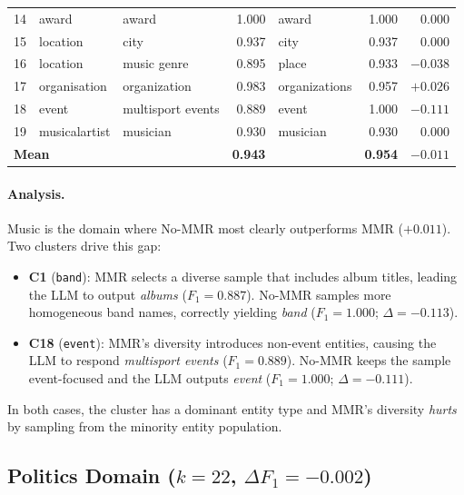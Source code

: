 \documentclass[11pt,a4paper]{article}
\begin{document}
\begin{table}[h]
\begin{tabular}{r l l r l r r}
14 & award         & award           & \cellcolor{green!15}1.000 & award        & \cellcolor{green!15}1.000 & $0.000$ \\
15 & location      & city            & \cellcolor{yellow!25}0.937 & city         & \cellcolor{yellow!25}0.937 & $0.000$ \\
16 & location      & music genre     & \cellcolor{red!15}0.895  & place        & \cellcolor{yellow!25}0.933 & $-0.038$ \\
17 & organisation  & organization    & \cellcolor{yellow!25}0.983 & organizations & \cellcolor{yellow!25}0.957 & $+0.026$ \\
18 & event         & multisport events & \cellcolor{red!15}0.889 & event       & \cellcolor{green!15}1.000 & $-0.111$ \\
19 & musicalartist & musician        & \cellcolor{yellow!25}0.930 & musician     & \cellcolor{yellow!25}0.930 & $0.000$ \\
\midrule
\multicolumn{2}{l}{\textbf{Mean}} &
  & \textbf{0.943} & & \textbf{0.954} & $-0.011$ \\
\bottomrule
\end{tabular}
\end{table}

\paragraph{Analysis.}
Music is the domain where No-MMR most clearly outperforms MMR ($+0.011$).
Two clusters drive this gap:
\begin{itemize}[leftmargin=1.5em]
  \item \textbf{C1} (\texttt{band}): MMR selects a diverse sample that includes album titles, leading the LLM to output \textit{albums} ($F_1 = 0.887$).  No-MMR samples more homogeneous band names, correctly yielding \textit{band} ($F_1 = 1.000$; $\Delta = -0.113$).
  \item \textbf{C18} (\texttt{event}): MMR's diversity introduces non-event entities, causing the LLM to respond \textit{multisport events} ($F_1 = 0.889$).  No-MMR keeps the sample event-focused and the LLM outputs \textit{event} ($F_1 = 1.000$; $\Delta = -0.111$).
\end{itemize}
In both cases, the cluster has a dominant entity type and MMR's diversity \emph{hurts} by sampling from the minority entity population.

\FloatBarrier

\subsection{Politics Domain ($k = 22$, $\Delta F_1 = -0.002$)}
\end{document}
